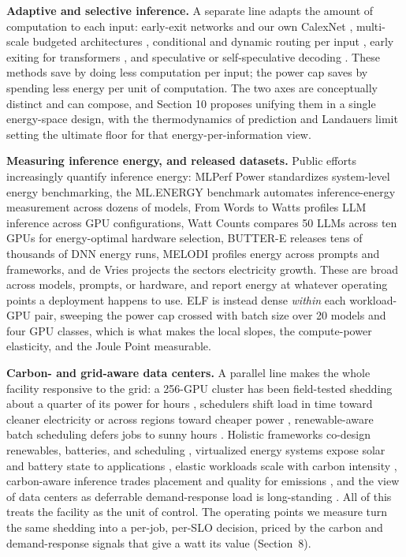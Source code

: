 \textbf{Adaptive and selective inference.} A separate line adapts the amount of computation to each input:
early-exit networks \cite{ref5} and our own CalexNet \cite{ref11}, multi-scale budgeted architectures \cite{ref54}, conditional and
dynamic routing per input \cite{ref6, ref7, ref55}, early exiting for transformers \cite{ref53}, and speculative or self-speculative
decoding \cite{ref8, ref52}. These methods save by doing less computation per input; the power cap saves by spending less energy per unit of
computation. The two axes are conceptually distinct and can compose, and Section 10 proposes unifying them in a single
energy-space design, with the thermodynamics of prediction \cite{ref9} and Landauer\textquotesingle s limit \cite{ref10} setting the ultimate
floor for that energy-per-information view.

\textbf{Measuring inference energy, and released datasets.} Public efforts increasingly quantify inference
energy: MLPerf Power \cite{ref31} standardizes system-level energy benchmarking, the ML.ENERGY benchmark \cite{ref32} automates
inference-energy measurement across dozens of models, From Words to Watts \cite{ref33} profiles LLM inference across GPU
configurations, Watt Counts \cite{ref48} compares 50 LLMs across ten GPUs for energy-optimal hardware selection,
BUTTER-E \cite{ref49} releases tens of thousands of DNN energy runs, MELODI \cite{ref50} profiles energy across prompts and
frameworks, and de Vries \cite{ref34} projects the sector\textquotesingle s electricity growth. These are broad across models, prompts,
or hardware, and report energy at whatever operating points a deployment happens to use. ELF is instead dense
\emph{within} each workload-GPU pair, sweeping the power cap crossed with batch size over 20 models and four
GPU classes, which is what makes the local slopes, the compute-power elasticity, and the Joule Point
measurable.

\textbf{Carbon- and grid-aware data centers.} A parallel line makes the whole facility responsive to the grid:
a 256-GPU cluster has been field-tested shedding about a quarter of its power for hours \cite{ref12}, schedulers shift
load in time toward cleaner electricity \cite{ref13} or across regions toward cheaper power \cite{ref41}, renewable-aware batch
scheduling defers jobs to sunny hours \cite{ref42}. Holistic frameworks co-design renewables, batteries, and scheduling
\cite{ref28}, virtualized energy systems expose solar and battery state to applications \cite{ref29}, elastic workloads scale
with carbon intensity \cite{ref30}, carbon-aware inference trades placement and quality for emissions \cite{ref51}, and the view
of data centers as deferrable demand-response load is long-standing \cite{ref14}. All of this treats the facility as the unit of control. The operating points we
measure turn the same shedding into a per-job, per-SLO decision, priced by the carbon and
demand-response signals that give a watt its value (Section~8).

